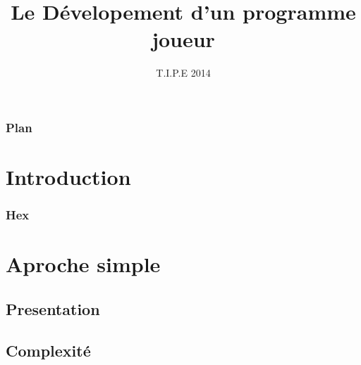 \documentclass{beamer}
\title[Hex]{Le Dévelopement d'un programme joueur}
\date{T.I.P.E 2014}
\begin{document}
\begin{frame}
  \titlepage
\end{frame}

\begin{frame}
  \frametitle{Plan}
  \tableofcontents
\end{frame}

\section{Introduction}

\begin{frame}
  \frametitle{Hex}
  \begin{HexBoard}[board size=10]
  \end{HexBoard}
\end{frame}

\section{Aproche simple}

\subsection{Presentation}


\subsection{Complexité}

\end{document}
